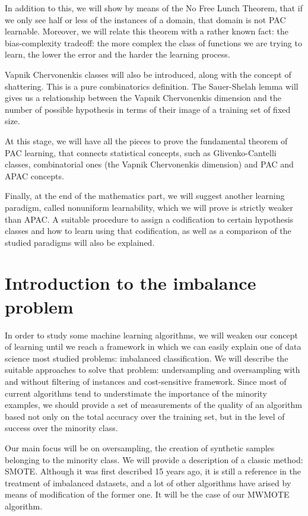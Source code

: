In addition to this, we will show by means of the No Free Lunch Theorem, that if we only see half or less of the instances 
of a domain, that domain is not PAC learnable. Moreover, we will relate this theorem with a rather known fact: the 
bias-complexity tradeoff: the more complex the class of functions we are trying to learn, the lower the error and the
harder the learning process.

Vapnik Chervonenkis classes will also be introduced, along with the concept of shattering. This is a pure combinatorics
definition. The Sauer-Shelah lemma will gives us a relationship between the Vapnik Chervonenkis dimension and the number
of possible hypothesis in terms of their image of a training set of fixed size. 

At this stage, we will have all the pieces to prove the fundamental theorem of PAC learning, that connects statistical
concepts, such as Glivenko-Cantelli classes, combinatorial ones (the Vapnik Chervonenkis dimension) and PAC and APAC
concepts.

Finally, at the end of the mathematics part, we will suggest another learning paradigm, called nonuniform learnability, 
which we will prove is strictly weaker than APAC. A suitable procedure to assign a codification to certain hypothesis
classes and how to learn using that codification, as well as a comparison of the studied paradigms will also
be explained.

\section*{Introduction to the imbalance problem}

In order to study some machine learning algorithms, we will weaken our concept of learning until we reach a framework in which
we can easily explain one of data science most studied problems: imbalanced classification. We will describe the suitable
approaches to solve that problem: undersampling and oversampling with and without filtering of instances and cost-sensitive 
framework. Since most of current algorithms tend to understimate the importance of the minority examples, 
we should provide a set of measurements of the quality of an algorithm based not only on the total accuracy over the training
set, but in the level of success over the minority class.

Our main focus will be on oversampling, the creation of synthetic samples belonging to the minority class. We will provide
a description of a classic method: SMOTE. Although it was first described 15 years ago, it is still a reference in the
treatment of imbalanced datasets, and a lot of other algorithms have arised by means of modification of the former one. It will be the case
of our MWMOTE algorithm.

